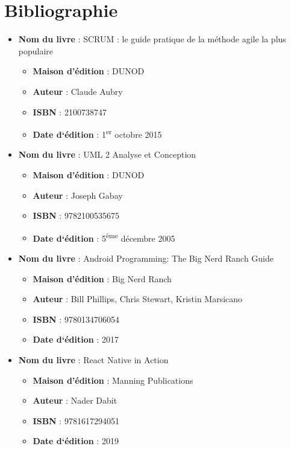 \chapter*{Bibliographie}
\adjustmtc
\begin{sloppypar} 
\thispagestyle{MyStyle}


\begin{itemize}
    \item \textbf{Nom du livre} : SCRUM : le guide pratique de la méthode agile la plus populaire
    \begin{itemize}
        \item [•] \textbf{Maison d’édition} : DUNOD
        \item [•] \textbf{Auteur} : Claude Aubry
        \item [•] \textbf{ISBN} : 2100738747
        \item [•] \textbf{Date d‘édition} : 1\textsuperscript{er} octobre 2015
    \end{itemize}
    
    \item \textbf{Nom du livre} : UML 2 Analyse et Conception
    \begin{itemize}
        \item [•] \textbf{Maison d’édition} : DUNOD
        \item [•] \textbf{Auteur} : Joseph Gabay
        \item [•] \textbf{ISBN} : 9782100535675
        \item [•] \textbf{Date d‘édition} : 5\textsuperscript{ème} décembre 2005
    \end{itemize}

    \item \textbf{Nom du livre} : Android Programming: The Big Nerd Ranch Guide
    \begin{itemize}
        \item [•] \textbf{Maison d’édition} : Big Nerd Ranch
        \item [•] \textbf{Auteur} : Bill Phillips, Chris Stewart, Kristin Marsicano
        \item [•] \textbf{ISBN} : 9780134706054
        \item [•] \textbf{Date d‘édition} : 2017
    \end{itemize}

    \item \textbf{Nom du livre} : React Native in Action
    \begin{itemize}
        \item [•] \textbf{Maison d’édition} : Manning Publications
        \item [•] \textbf{Auteur} : Nader Dabit
        \item [•] \textbf{ISBN} : 9781617294051
        \item [•] \textbf{Date d‘édition} : 2019
    \end{itemize}


\end{itemize}
\end{sloppypar}
